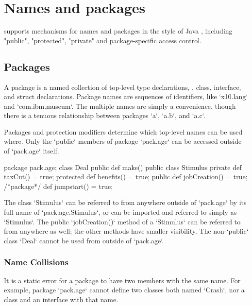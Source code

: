 \chapter{Names and packages}
\label{packages} 

\Xten{} supports mechanisms for names and packages in the style of Java
\cite[\S 6,\S 7]{jls2}, including \xcd"public", \xcd"protected", \xcd"private"
and package-specific access control.

\section{Packages}

A package is a named collection of top-level type declarations, \viz, class,
interface, and struct declarations. Package names are sequences of
identifiers, like \xcd`x10.lang` and \xcd`com.ibm.museum`. The multiple names
are simply a convenience, though there is a tenuous relationship between
packages \xcd`a`, \xcd`a.b`, and \xcd`a.c`. 

Packages and protection modifiers determine which top-level names can be used
where. Only the \xcd`public` members of package \xcd`pack.age` can be accessed
outside of \xcd`pack.age` itself.  
%
\begin{xten}
package pack.age;
class Deal {
  public def make() {}
}
public class Stimulus {
  private def taxCut() = true;
  protected def benefits() = true;
  public def jobCreation() = true;
  /*package*/ def jumpstart() = true;
}
\end{xten}
%

The class \xcd`Stimulus` can be referred to from anywhere outside of
\xcd`pack.age` by its full name of \xcd`pack.age.Stimulus`, or can be imported
and referred to simply as \xcd`Stimulus`.  The public \xcd`jobCreation()`
method of a \xcd`Stimulus` can be referred to from anywhere as well; the other
methods have smaller visibility.  The non-\xcd`public` class \xcd`Deal` cannot
be used from outside of \xcd`pack.age`.  



\subsection{Name Collisions}

It is a static error for a package to have two members with the same name. For
example, package \xcd`pack.age` cannot define two classes both named
\xcd`Crash`, nor a class and an interface with that name.

